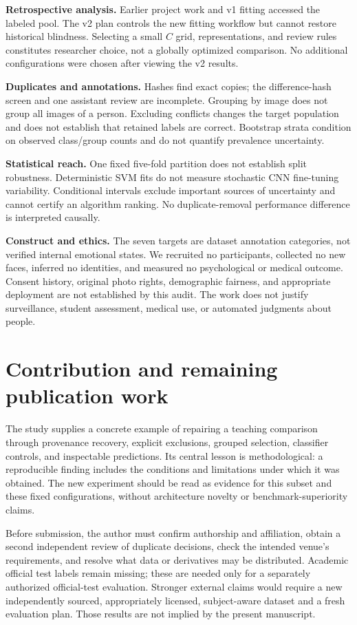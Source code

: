 \documentclass[11pt,a4paper]{article}
\begin{document}
\textbf{Retrospective analysis.} Earlier project work and v1 fitting accessed
the labeled pool. The v2 plan controls the new fitting workflow but cannot
restore historical blindness. Selecting a small $C$ grid, representations, and
review rules constitutes researcher choice, not a globally optimized comparison.
No additional configurations were chosen after viewing the v2 results.

\textbf{Duplicates and annotations.} Hashes find exact copies; the difference-hash
screen and one assistant review are incomplete. Grouping by image does not group
all images of a person. Excluding conflicts changes the target population and
does not establish that retained labels are correct. Bootstrap strata condition
on observed class/group counts and do not quantify prevalence uncertainty.

\textbf{Statistical reach.} One fixed five-fold partition does not establish
split robustness. Deterministic SVM fits do not measure stochastic CNN
fine-tuning variability. Conditional intervals exclude important sources of
uncertainty and cannot certify an algorithm ranking. No duplicate-removal
performance difference is interpreted causally.

\textbf{Construct and ethics.} The seven targets are dataset annotation categories,
not verified internal emotional states. We recruited no participants, collected
no new faces, inferred no identities, and measured no psychological or medical
outcome. Consent history, original photo rights, demographic fairness, and
appropriate deployment are not established by this audit. The work does not
justify surveillance, student assessment, medical use, or automated judgments
about people.

\section{Contribution and remaining publication work}
The study supplies a concrete example of repairing a teaching comparison through
provenance recovery, explicit exclusions, grouped selection, classifier controls,
and inspectable predictions. Its central lesson is methodological: a reproducible
finding includes the conditions and limitations under which it was obtained.
The new experiment should be read as evidence for this subset and these fixed
configurations, without architecture novelty or benchmark-superiority claims.

Before submission, the author must confirm authorship and affiliation, obtain a
second independent review of duplicate decisions, check the intended venue's
requirements, and resolve what data or derivatives may be distributed. Academic
official test labels remain missing; these are needed only for a separately
authorized official-test evaluation. Stronger external claims would require a
new independently sourced, appropriately licensed, subject-aware dataset and a
fresh evaluation plan. Those results are not implied by the present manuscript.
\end{document}
